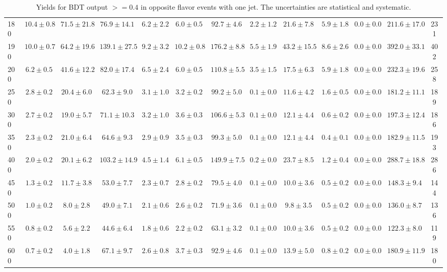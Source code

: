 \begin{table}
{\begin{center}
\begin{tabular}{l | c c | c c c c c c c c  | c c}
180 & $10.4\pm0.8$ & $71.5\pm21.8$ & $76.9\pm14.1$ & $6.2\pm2.2$ & $6.0\pm0.5$ & $92.7\pm4.6$ & $2.2\pm1.2$ & $21.6\pm7.8$ & $5.9\pm1.8$ & $0.0\pm0.0$ & $211.6\pm17.0$ & 231 \\
190 & $10.0\pm0.7$ & $64.2\pm19.6$ & $139.1\pm27.5$ & $9.2\pm3.2$ & $10.2\pm0.8$ & $176.2\pm8.8$ & $5.5\pm1.9$ & $43.2\pm15.5$ & $8.6\pm2.6$ & $0.0\pm0.0$ & $392.0\pm33.1$ & 402 \\
200 & $6.2\pm0.5$ & $41.6\pm12.2$ & $82.0\pm17.4$ & $6.5\pm2.4$ & $6.0\pm0.5$ & $110.8\pm5.5$ & $3.5\pm1.5$ & $17.5\pm6.3$ & $5.9\pm1.8$ & $0.0\pm0.0$ & $232.3\pm19.6$ & 258 \\
250 & $2.8\pm0.2$ & $20.4\pm6.0$ & $62.3\pm9.0$ & $3.1\pm1.0$ & $3.2\pm0.2$ & $99.2\pm5.0$ & $0.1\pm0.0$ & $11.6\pm4.2$ & $1.6\pm0.5$ & $0.0\pm0.0$ & $181.2\pm11.1$ & 189 \\
300 & $2.7\pm0.2$ & $19.0\pm5.7$ & $71.1\pm10.3$ & $3.2\pm1.0$ & $3.6\pm0.3$ & $106.6\pm5.3$ & $0.1\pm0.0$ & $12.1\pm4.4$ & $0.6\pm0.2$ & $0.0\pm0.0$ & $197.3\pm12.4$ & 186 \\
350 & $2.3\pm0.2$ & $21.0\pm6.4$ & $64.6\pm9.3$ & $2.9\pm0.9$ & $3.5\pm0.3$ & $99.3\pm5.0$ & $0.1\pm0.0$ & $12.1\pm4.4$ & $0.4\pm0.1$ & $0.0\pm0.0$ & $182.9\pm11.5$ & 193 \\
400 & $2.0\pm0.2$ & $20.1\pm6.2$ & $103.2\pm14.9$ & $4.5\pm1.4$ & $6.1\pm0.5$ & $149.9\pm7.5$ & $0.2\pm0.0$ & $23.7\pm8.5$ & $1.2\pm0.4$ & $0.0\pm0.0$ & $288.7\pm18.8$ & 286 \\
450 & $1.3\pm0.2$ & $11.7\pm3.8$ & $53.0\pm7.7$ & $2.3\pm0.7$ & $2.8\pm0.2$ & $79.5\pm4.0$ & $0.1\pm0.0$ & $10.0\pm3.6$ & $0.5\pm0.2$ & $0.0\pm0.0$ & $148.3\pm9.4$ & 144 \\
500 & $1.0\pm0.2$ & $8.0\pm2.8$ & $49.0\pm7.1$ & $2.1\pm0.6$ & $2.6\pm0.2$ & $71.9\pm3.6$ & $0.1\pm0.0$ & $9.8\pm3.5$ & $0.5\pm0.2$ & $0.0\pm0.0$ & $136.0\pm8.7$ & 136 \\
550 & $0.8\pm0.2$ & $5.6\pm2.2$ & $44.6\pm6.4$ & $1.8\pm0.6$ & $2.2\pm0.2$ & $63.1\pm3.2$ & $0.1\pm0.0$ & $10.0\pm3.6$ & $0.5\pm0.2$ & $0.0\pm0.0$ & $122.3\pm8.0$ & 119 \\
600 & $0.7\pm0.2$ & $4.0\pm1.8$ & $67.1\pm9.7$ & $2.6\pm0.8$ & $3.7\pm0.3$ & $92.9\pm4.6$ & $0.1\pm0.0$ & $13.9\pm5.0$ & $0.8\pm0.2$ & $0.0\pm0.0$ & $180.9\pm11.9$ & 180 \\
\hline
\end{tabular}
\end{center}
\caption{Yields for BDT output $>=0.4$ in opposite flavor events with one jet. The uncertainties are statistical and systematic.\label{tab:yields_bdthi_1j}}}
\end{table}

